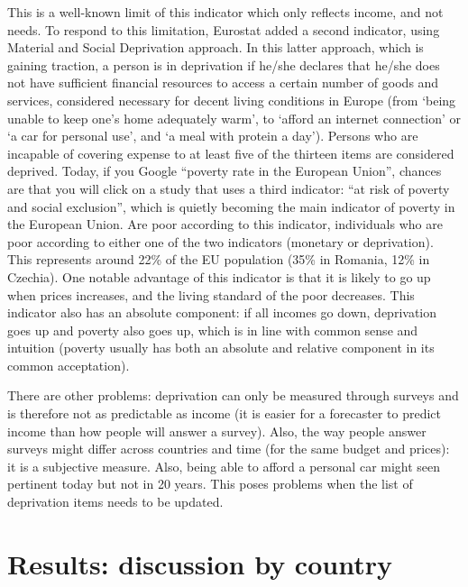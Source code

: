 \documentclass[
  9pt,
  a4paper,
  numbers=noendperiod,
  DIV=12]{scrartcl}
\begin{document}
\begin{tcolorbox}[enhanced jigsaw, leftrule=.75mm, rightrule=.15mm, breakable, opacityback=0, toprule=.15mm, colback=white, arc=.35mm, left=2mm, colframe=quarto-callout-note-color-frame, bottomrule=.15mm]
This is a well-known limit of this indicator which only reflects income,
and not needs. To respond to this limitation, Eurostat added a second
indicator, using Material and Social Deprivation approach. In this
latter approach, which is gaining traction, a person is in deprivation
if he/she declares that he/she does not have sufficient financial
resources to access a certain number of goods and services, considered
necessary for decent living conditions in Europe (from `being unable to
keep one's home adequately warm', to `afford an internet connection' or
`a car for personal use', and `a meal with protein a day'). Persons who
are incapable of covering expense to at least five of the thirteen items
are considered deprived. Today, if you Google ``poverty rate in the
European Union'', chances are that you will click on a study that uses a
third indicator: ``at risk of poverty and social exclusion'', which is
quietly becoming the main indicator of poverty in the European Union.
Are poor according to this indicator, individuals who are poor according
to either one of the two indicators (monetary or deprivation). This
represents around 22\% of the EU population (35\% in Romania, 12\% in
Czechia). One notable advantage of this indicator is that it is likely
to go up when prices increases, and the living standard of the poor
decreases. This indicator also has an absolute component: if all incomes
go down, deprivation goes up and poverty also goes up, which is in line
with common sense and intuition (poverty usually has both an absolute
and relative component in its common acceptation).

There are other problems: deprivation can only be measured through
surveys and is therefore not as predictable as income (it is easier for
a forecaster to predict income than how people will answer a survey).
Also, the way people answer surveys might differ across countries and
time (for the same budget and prices): it is a subjective measure. Also,
being able to afford a personal car might seen pertinent today but not
in 20 years. This poses problems when the list of deprivation items
needs to be updated.

\end{tcolorbox}

\hypertarget{results-discussion-by-country}{%
\section{Results: discussion by
country}\label{results-discussion-by-country}}
\end{document}

